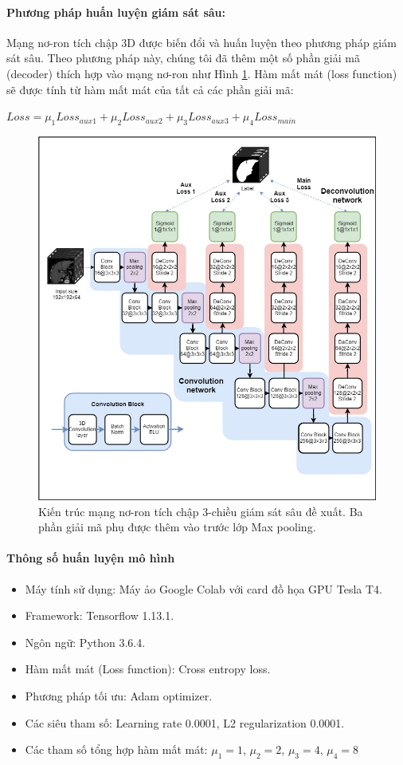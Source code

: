 \paragraph{Phương pháp huấn luyện giám sát sâu:}
Mạng nơ-ron tích chập 3D được biến đổi và huấn luyện theo phương pháp giám sát sâu. Theo phương pháp này, chúng tôi đã thêm một số phần giải mã (decoder) thích hợp vào mạng nơ-ron như Hình \ref{our_CNN}. Hàm mất mát (loss function) sẽ được tính từ hàm mất mát của tất cả các phần giải mã:\\
\begin{center} $Loss = \mu_1 Loss_{aux1} + \mu_2 Loss_{aux2}+\mu_3 Loss_{aux3}+\mu_4 Loss_{main}$\end{center}
\begin{figure}[h]
\centering
    \includegraphics[totalheight=15cm]{Images/CNN.jpg}
    \caption{Kiến trúc mạng nơ-ron tích chập 3-chiều giám sát sâu đề xuất. Ba phần giải mã phụ được thêm vào trước lớp Max pooling.}
    \label{our_CNN}
\end{figure}
\paragraph{Thông số huấn luyện mô hình}
\begin{itemize}
\item Máy tính sử dụng: Máy ảo Google Colab với card đồ họa GPU Tesla T4.
\item Framework: Tensorflow 1.13.1.
\item Ngôn ngữ: Python 3.6.4.
\item Hàm mất mát (Loss function): Cross entropy loss.
\item Phương pháp tối ưu: Adam optimizer.
\item Các siêu tham số: Learning rate 0.0001, L2 regularization 0.0001.
\item Các tham số tổng hợp hàm mất mát: $\mu_1 = 1$,  $\mu_2 = 2$,  $\mu_3 = 4$,  $\mu_4 = 8$
\end{itemize}
